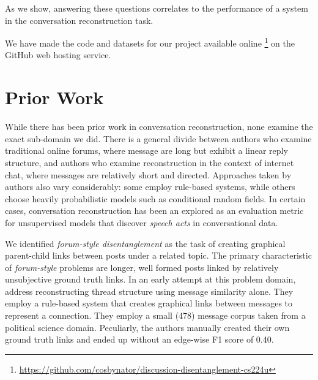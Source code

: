 \documentclass{article}
\begin{document}
As we show, answering these questions correlates to the performance of a system
in the conversation reconstruction task. 

We have made the code and datasets for our project available online
\footnote{\url{https://github.com/cosbynator/discussion-disentanglement-cs224u}} on the
GitHub web hosting service.

\section{Prior Work}
\label{sec:prior_work}
While there has been prior work in conversation reconstruction, none examine
the exact sub-domain we did. There is a general divide between authors
who examine traditional online forums, where message are long but exhibit a linear
reply structure, and authors who examine reconstruction in the context of internet chat, 
where messages are relatively short and directed. Approaches taken by authors also vary considerably:
some employ rule-based systems, while others choose heavily probabilistic models such as conditional
random fields. In certain cases, conversation reconstruction has been an explored as an evaluation metric 
for unsupervised models that discover \textit{speech acts} in conversational data.

We identified \textit{forum-style disentanglement} as the task of creating 
graphical parent-child links between posts under a related topic. The primary characteristic 
of \textit{forum-style} problems are longer, well formed posts 
linked by relatively unsubjective ground truth links. In an early
attempt at this problem domain, \cite{Wang2008a} address reconstructing
thread structure using message similarity alone. They employ a rule-based
system that creates graphical links between messages to represent a connection.
They employ a small (478) message corpus taken from a political science domain. 
Peculiarly, the authors manually created their own ground truth links and ended
up without an edge-wise F1 score of 0.40.
\end{document}
